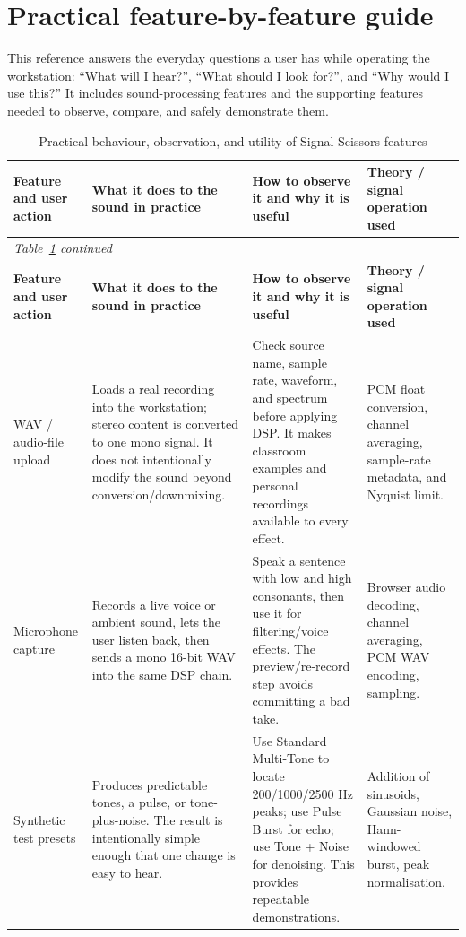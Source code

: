 \documentclass[11pt,a4paper]{article}
\renewcommand{\arraystretch}{1.22}
\begin{document}
\section{Practical feature-by-feature guide}
This reference answers the everyday questions a user has while operating the workstation: ``What will I hear?'', ``What should I look for?'', and ``Why would I use this?'' It includes sound-processing features and the supporting features needed to observe, compare, and safely demonstrate them.

{\footnotesize
\setlength{\tabcolsep}{2pt}
\renewcommand{\arraystretch}{1.32}
\begin{longtable}{@{}p{.18\linewidth}p{.27\linewidth}p{.27\linewidth}p{.20\linewidth}@{}}
\caption{Practical behaviour, observation, and utility of Signal Scissors features}\label{tab:practical-features}\\
\toprule
\textbf{Feature and user action} & \textbf{What it does to the sound in practice} & \textbf{How to observe it and why it is useful} & \textbf{Theory / signal operation used}\\
\midrule
\endfirsthead
\multicolumn{4}{l}{\small\itshape Table~\ref{tab:practical-features} continued}\\
\toprule
\textbf{Feature and user action} & \textbf{What it does to the sound in practice} & \textbf{How to observe it and why it is useful} & \textbf{Theory / signal operation used}\\
\midrule
\endhead
\bottomrule
\endfoot

WAV / audio-file upload & Loads a real recording into the workstation; stereo content is converted to one mono signal. It does not intentionally modify the sound beyond conversion/downmixing. & Check source name, sample rate, waveform, and spectrum before applying DSP. It makes classroom examples and personal recordings available to every effect. & PCM float conversion, channel averaging, sample-rate metadata, and Nyquist limit.\\

Microphone capture & Records a live voice or ambient sound, lets the user listen back, then sends a mono 16-bit WAV into the same DSP chain. & Speak a sentence with low and high consonants, then use it for filtering/voice effects. The preview/re-record step avoids committing a bad take. & Browser audio decoding, channel averaging, PCM WAV encoding, sampling.\\

Synthetic test presets & Produces predictable tones, a pulse, or tone-plus-noise. The result is intentionally simple enough that one change is easy to hear. & Use Standard Multi-Tone to locate 200/1000/2500 Hz peaks; use Pulse Burst for echo; use Tone + Noise for denoising. This provides repeatable demonstrations. & Addition of sinusoids, Gaussian noise, Hann-windowed burst, peak normalisation.\\


\end{longtable}}
\end{document}
